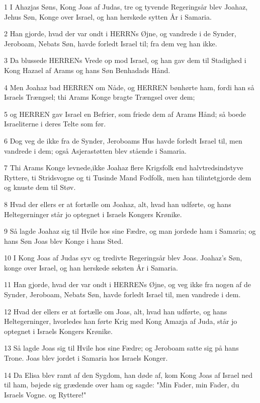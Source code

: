 \par 1 I Ahazjas Søns, Kong Joas af Judas, tre og tyvende Regeringsår blev Joahaz, Jehus Søn, Konge over Israel, og han herskede sytten År i Samaria.
\par 2 Han gjorde, hvad der var ondt i HERRNs Øjne, og vandrede i de Synder, Jeroboam, Nebats Søn, havde forledt Israel til; fra dem veg han ikke.
\par 3 Da blussede HERRENs Vrede op mod Israel, og han gav dem til Stadighed i Kong Hazael af Arams og hans Søn Benhadads Hånd.
\par 4 Men Joahaz bad HERREN om Nåde, og HERREN bønhørte ham, fordi han så Israels Trængsel; thi Arams Konge bragte Trængsel over dem;
\par 5 og HERREN gav Israel en Befrier, som friede dem af Arams Hånd; så boede Israeliterne i deres Telte som før.
\par 6 Dog veg de ikke fra de Synder, Jeroboams Hus havde forledt Israel til, men vandrede i dem; også Asjerastøtten blev stående i Samaria.
\par 7 Thi Arams Konge levnede,ikke Joahaz flere Krigsfolk end halvtredsindstyve Ryttere, ti Stridsvogne og ti Tusinde Mand Fodfolk, men han tilintetgjorde dem og knuste dem til Støv.
\par 8 Hvad der ellers er at fortælle om Joahaz, alt, hvad han udførte, og hans Heltegerninger står jo optegnet i Israels Kongers Krønike.
\par 9 Så lagde Joahaz sig til Hvile hos sine Fædre, og man jordede ham i Samaria; og hans Søn Joas blev Konge i hans Sted.
\par 10 I Kong Joas af Judas syv og tredivte Regeringsår blev Joas. Joahaz's Søn, konge over Israel, og han herskede seksten År i Samaria.
\par 11 Han gjorde, hvad der var ondt i HERRENs Øjne, og veg ikke fra nogen af de Synder, Jeroboam, Nebats Søn, havde forledt Israel til, men vandrede i dem.
\par 12 Hvad der ellers er at fortælle om Joas, alt, hvad han udførte, og hans Heltegerninger, hvorledes han førte Krig med Kong Amazja af Juda, står jo optegnet i Israels Kongers Krønike.
\par 13 Så lagde Joas sig til Hvile hos sine Fædre; og Jeroboam satte sig på hans Trone. Joas blev jordet i Samaria hos Israels Konger.
\par 14 Da Elisa blev ramt af den Sygdom, han døde af, kom Kong Joas af Israel ned til ham, bøjede sig grædende over ham og sagde: "Min Fader, min Fader, du Israels Vogne. og Ryttere!"
